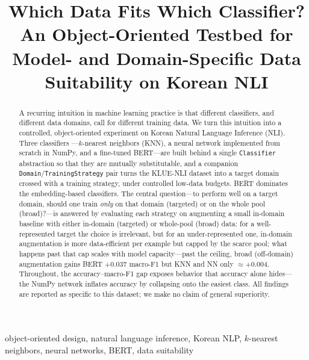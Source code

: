 \documentclass[conference]{IEEEtran}
\begin{document}
\title{Which Data Fits Which Classifier? An Object-Oriented
Testbed for Model- and Domain-Specific Data Suitability on Korean NLI}

\author{
}

\maketitle

\begin{abstract}
A recurring intuition in machine learning practice is that different
classifiers, and different data domains, call for different training
data. We turn this intuition into a controlled, object-oriented
experiment on Korean Natural Language Inference (NLI). Three classifiers
---$k$-nearest neighbors (KNN), a neural network implemented from scratch
in NumPy, and a fine-tuned BERT---are built behind a single
\texttt{Classifier} abstraction so that they are mutually substitutable,
and a companion \texttt{Domain}/\texttt{TrainingStrategy} pair turns the
KLUE-NLI dataset into a target domain crossed with a training strategy,
under controlled low-data budgets. BERT dominates the
embedding-based classifiers. The central question---to perform well on a
target domain, should one train \emph{only} on that domain (targeted) or
on the whole pool (broad)?---is answered by evaluating each strategy on
augmenting a small in-domain baseline with either in-domain (targeted)
or whole-pool (broad) data: for a well-represented target the choice is
irrelevant, but for an under-represented one, in-domain augmentation is
more data-efficient per example but capped by the scarce pool; what
happens past that cap scales with model capacity---past the ceiling, broad
(off-domain) augmentation gains BERT $+0.037$ macro-F1 but KNN and NN only
$\approx +0.004$. Throughout, the accuracy--macro-F1 gap
exposes behavior that accuracy alone hides---the NumPy network inflates
accuracy by collapsing onto the easiest class. All findings are reported
as specific to this dataset; we make no claim of general superiority.
\end{abstract}

\begin{IEEEkeywords}
object-oriented design, natural language inference, Korean NLP,
$k$-nearest neighbors, neural networks, BERT, data suitability
\end{IEEEkeywords}
\end{document}
